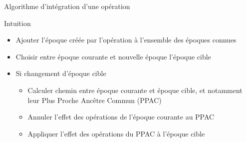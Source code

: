 \begin{frame}{Algorithme d'intégration d'une opération \ren}
  \begin{block}{Intuition}
    \begin{itemize}
      \item<2-> Ajouter l'époque créée par l'opération \ren à l'ensemble des époques connues
      \item<3-> Choisir entre époque courante et nouvelle époque \alert{l'époque cible}
      \item<4-> Si changement d'époque cible
      \begin{itemize}
        \item<5-> Calculer chemin entre époque courante et époque cible, et notamment leur Plus Proche Ancêtre Commun (PPAC)
        \item<6-> Annuler l'effet des opérations \ren de l'époque courante au PPAC
        \item<7-> Appliquer l'effet des opérations \ren du PPAC à l'époque cible
      \end{itemize}
    \end{itemize}
  \end{block}
\end{frame}

